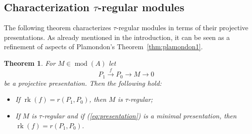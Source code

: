 \documentclass[12pt,reqno]{amsart}
\newtheorem{Thm}{Theorem}[section]
\theoremstyle{definition}
\newcommand{\rk}{\operatorname{rk}}
\newcommand{\md}{\operatorname{mod}}
\begin{document}


\subsection{Characterization $\tau$-regular modules}
The following theorem characterizes $\tau$-regular modules in terms
of their projective presentations.
As already mentioned in the introduction, it can be seen as a refinement of aspects of Plamondon's Theorem~\ref{thm:plamondon1}.

\begin{Thm}\label{thm:main0b}
For $M \in \md(A)$ let
\begin{equation}\label{eq:presentation}
P_1 \xrightarrow{f} P_0 \to M \to 0
\end{equation}
be a projective presentation.
Then
the following hold:
\begin{itemize}\itemsep2mm

\item[(i)]
If $\rk(f) = r(P_1,P_0)$, then $M$ is $\tau$-regular;

\item[(ii)]
If $M$ is $\tau$-regular and if (\ref{eq:presentation}) is a minimal presentation,
then $\rk(f) = r(P_1,P_0)$.

\end{itemize}
\end{Thm}
\end{document}

